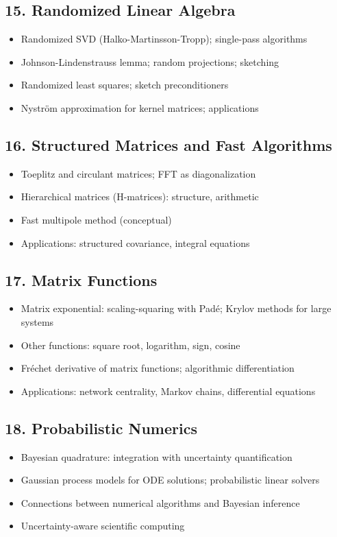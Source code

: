 \subsection{15. Randomized Linear Algebra}
\begin{itemize}
\item Randomized SVD (Halko-Martinsson-Tropp); single-pass algorithms
\item Johnson-Lindenstrauss lemma; random projections; sketching
\item Randomized least squares; sketch preconditioners
\item Nystr\"om approximation for kernel matrices; applications
\end{itemize}

\subsection{16. Structured Matrices and Fast Algorithms}
\begin{itemize}
\item Toeplitz and circulant matrices; FFT as diagonalization
\item Hierarchical matrices (H-matrices): structure, arithmetic
\item Fast multipole method (conceptual)
\item Applications: structured covariance, integral equations
\end{itemize}

\subsection{17. Matrix Functions}
\begin{itemize}
\item Matrix exponential: scaling-squaring with Pad\'e; Krylov methods for large systems
\item Other functions: square root, logarithm, sign, cosine
\item Fr\'echet derivative of matrix functions; algorithmic differentiation
\item Applications: network centrality, Markov chains, differential equations
\end{itemize}

\subsection{18. Probabilistic Numerics}
\begin{itemize}
\item Bayesian quadrature: integration with uncertainty quantification
\item Gaussian process models for ODE solutions; probabilistic linear solvers
\item Connections between numerical algorithms and Bayesian inference
\item Uncertainty-aware scientific computing
\end{itemize}

